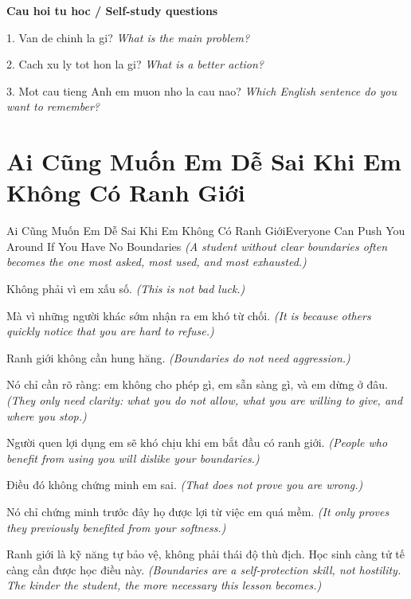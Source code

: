 \begin{tuhocnhanh}
\textbf{Cau hoi tu hoc / Self-study questions}

1. Van de chinh la gi? \textit{What is the main problem?}

2. Cach xu ly tot hon la gi? \textit{What is a better action?}

3. Mot cau tieng Anh em muon nho la cau nao? \textit{Which English sentence do you want to remember?}
\end{tuhocnhanh}
\ngancach

\section{Ai Cũng Muốn Em Dễ Sai Khi Em Không Có Ranh Giới}
\begin{truyen}{Ai Cũng Muốn Em Dễ Sai Khi Em Không Có Ranh Giới}{Everyone Can Push You Around If You Have No Boundaries}
\textit{(A student without clear boundaries often becomes the one most asked, most used, and most exhausted.)}

Không phải vì em xấu số.
\textit{(This is not bad luck.)}

Mà vì những người khác sớm nhận ra em khó từ chối.
\textit{(It is because others quickly notice that you are hard to refuse.)}

Ranh giới không cần hung hăng.
\textit{(Boundaries do not need aggression.)}

Nó chỉ cần rõ ràng: em không cho phép gì, em sẵn sàng gì, và em dừng ở đâu.
\textit{(They only need clarity: what you do not allow, what you are willing to give, and where you stop.)}

Người quen lợi dụng em sẽ khó chịu khi em bắt đầu có ranh giới.
\textit{(People who benefit from using you will dislike your boundaries.)}

Điều đó không chứng minh em sai.
\textit{(That does not prove you are wrong.)}

Nó chỉ chứng minh trước đây họ được lợi từ việc em quá mềm.
\textit{(It only proves they previously benefited from your softness.)}

\end{truyen}

\begin{baihoc}
Ranh giới là kỹ năng tự bảo vệ, không phải thái độ thù địch. Học sinh càng tử tế càng cần được học điều này.
\textit{(Boundaries are a self-protection skill, not hostility. The kinder the student, the more necessary this lesson becomes.)}
\end{baihoc}

